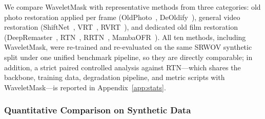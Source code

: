 We compare WaveletMask with representative methods from three categories: old photo restoration applied per frame (OldPhoto~\cite{wan2020bringing}, DeOldify~\cite{jantic2019deoldify}), general video restoration (ShiftNet~\cite{li2023shiftnet}, VRT~\cite{liang2024vrt}, RVRT~\cite{liang2022rvrt}), and dedicated old film restoration (DeepRemaster~\cite{iizuka2019deepremaster}, RTN~\cite{rtn2022}, RRTN~\cite{rrtn2024}, MambaOFR~\cite{mao2025mambaofr}). All ten methods, including WaveletMask, were re-trained and re-evaluated on the same SRWOV synthetic split under one unified benchmark pipeline, so they are directly comparable; in addition, a strict paired controlled analysis against RTN---which shares the backbone, training data, degradation pipeline, and metric scripts with WaveletMask---is reported in Appendix~\ref{app:stats}.

\subsubsection{Quantitative Comparison on Synthetic Data}\label{subsec:sota_quant}

